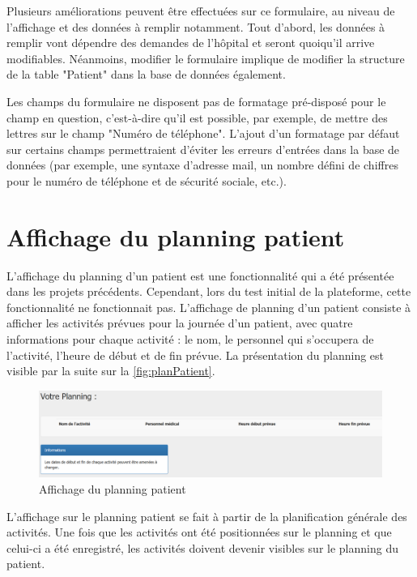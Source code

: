 \documentclass[noposter]{polytech/polytech}
\begin{document}
Plusieurs améliorations peuvent être effectuées sur ce formulaire, au niveau de l'affichage et des données à remplir notamment. Tout d'abord, les données à remplir vont dépendre des demandes de l'hôpital et seront quoiqu'il arrive modifiables. Néanmoins, modifier le formulaire implique de modifier la structure de la table "Patient" dans la base de données également. 

Les champs du formulaire ne disposent pas de formatage pré-disposé pour le champ en question, c'est-à-dire qu'il est possible, par exemple, de mettre des lettres sur le champ "Numéro de téléphone". L'ajout d'un formatage par défaut sur certains champs permettraient d'éviter les erreurs d'entrées dans la base de données (par exemple, une syntaxe d'adresse mail, un nombre défini de chiffres pour le numéro de téléphone et de sécurité sociale, etc.). 


\section{Affichage du planning patient}
\label{sec:planPatient}

L'affichage du planning d'un patient est une fonctionnalité qui a été présentée dans les projets précédents. Cependant, lors du test initial de la plateforme, cette fonctionnalité ne fonctionnait pas. L'affichage de planning d'un patient consiste à afficher les activités prévues pour la journée d'un patient, avec quatre informations pour chaque activité : le nom, le personnel qui s'occupera de l'activité, l'heure de début et de fin prévue. La présentation du planning est visible par la suite sur la \autoref{fig:planPatient}.

\begin{figure}
	\includegraphics[scale=0.45]{images/planningPatient}
	\caption{Affichage du planning patient}
	\label{fig:planPatient}
\end{figure}

L'affichage sur le planning patient se fait à partir de la planification générale des activités. Une fois que les activités ont été positionnées sur le planning et que celui-ci a été enregistré, les activités doivent devenir visibles sur le planning du patient. 
\end{document}
